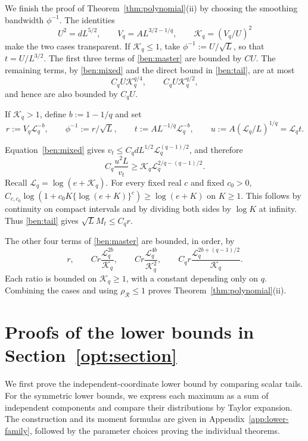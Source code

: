 \documentclass[11pt,letterpaper]{article}
\newenvironment{recovered}{}{}
\theoremstyle{remark}
\newcommand{\rh}{\rho_{\mathcal R}}
\begin{document}
We finish the proof of Theorem~\ref{thm:polynomial}\textup{(ii)} by choosing the
smoothing bandwidth \(\phi^{-1}\). The identities
\[
 U^2=dL^{5/2},\qquad V_q=AL^{3/2-1/q},\qquad
 \mathcal K_q=(V_q/U)^2
\]
make the two cases transparent. If \(\mathcal K_q\le1\), take
\(\phi^{-1}:=U/\sqrt L\), so that \(t=U/L^{3/2}\).
The first three terms of \eqref{ben:master} are bounded by \(CU\).
The remaining terms, by \eqref{ben:mixed} and the direct bound in
\eqref{ben:tail}, are at most
\[
 C_qU \mathcal K_q^{q/4},\qquad C_qU \mathcal K_q^{q/2},
\]
and hence are also bounded by \(C_qU\).

If \(\mathcal K_q>1\), {define} \(b:=1-1/q\) and set
\[
 r:=V_q \mathcal{L}_q^{-b},\qquad \phi^{-1}:=r/\sqrt L,\qquad
 t:=AL^{-1/q}\mathcal{L}_q^{-b},\qquad u:=A(\mathcal{L}_q/L)^{1/q}=\mathcal{L}_q t.
\]
{
Equation~\eqref{ben:mixed} gives
\(v_t\le C_q dL^{1/2}\mathcal{L}_q^{(q-1)/2}\), and therefore
\[
 C_q\frac{u^2L}{v_t}\ge
 \mathcal K_q \mathcal{L}_q^{2/q-(q-1)/2}.
\]
Recall $\mathcal L_q=\log(e+\mathcal K_q)$. 
For every fixed real \(c\) and fixed \(c_0>0\),
\(C_{c,c_0}\log(1+c_0K\{\log(e+K)\}^c)\ge\log(e+K)\)
on \(K\ge1\). This follows by continuity on compact intervals and
by dividing both sides by \(\log K\) at infinity. Thus
\eqref{ben:tail} gives \(\sqrt L M_t\le C_q r\).

}The other four terms of \eqref{ben:master} are bounded, in order, by
\[
 r,\qquad C r\frac{\mathcal{L}_q^{2b}}{\mathcal K_q},\qquad
 C r\frac{\mathcal{L}_q^{4b}}{\mathcal K_q^2},\qquad
 C_q r\frac{\mathcal{L}_q^{2b+(q-1)/2}}{\mathcal K_q}.
\]
Each ratio is bounded on \(\mathcal K_q\ge1\), with a constant depending only
on \(q\). \begin{recovered}Combining the cases and using \(\rh\le1\)
proves Theorem~\ref{thm:polynomial}\textup{(ii)}.\end{recovered}


\section{Proofs of the lower bounds in Section~\ref*{opt:section}}\label{app:sharpness-proofs}

We first prove the independent-coordinate lower bound by comparing
scalar tails. For the symmetric lower bounds, we express each maximum
as a sum of independent components and compare their distributions
by Taylor expansion. The construction and its moment formulas are
given in Appendix~\ref{app:lower-family}, followed by the parameter
choices proving the individual theorems.
\end{document}
